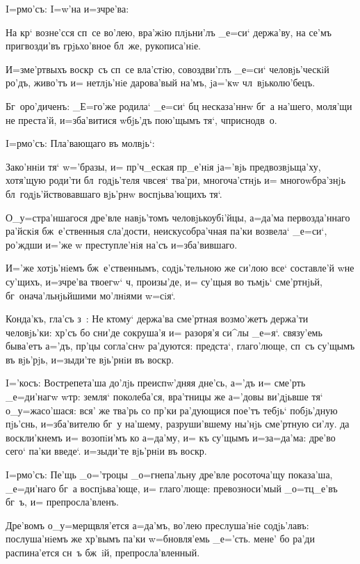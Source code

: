  I=рмо'съ: I=w'на и=з\ъ чре'ва:

На кр` возне'сся сп~се во'лею, вра'жiю плjьни'лъ 
_е=си` держа'ву, на се'мъ пригвозди'въ грjьхо'вное бл~же, 
рукописа'нiе.

И=з\ъ ме'ртвыхъ воскр~съ сп~се вла'стiю, совоздви'глъ 
_е=си` человjь'ческiй ро'дъ, живо'тъ и= нетлjь'нiе 
дарова'вый на'мъ, jа='кw чл~вjьколю'бецъ.

Бг~оро'диченъ: _Е=го'же родила` _е=си` бц 
несказа'ннw бг~а на'шего, моля'щи не преста'й, 
и=зба'витися w\т бjь'дъ пою'щымъ тя`, ч приснодв~о.

 I=рмо'съ: Пла'вающаго въ молвjь`:

Зако'ннiи тя` w='бразы, и= пр'ч_еская 
пр_е'нiя jа='вjь предвозвjьща'ху, хотя'щую роди'ти 
бл~годjь'теля ч всея` тва'ри, многоча'стнjь и= 
многоwбра'знjь бл~годjь'йствовавшаго вjь'рнw 
воспjьва'ющихъ тя`.

О_у=стра'ншагося дре'вле навjь'томъ человjькоубi'йцы, 
а=да'ма первозда'ннаго ра'йскiя бж~е'ственныя сла'дости, 
неискусобра'чная па'ки возвела` _е=си`, ро'ждши и='же w\т 
преступле'нiя на'съ и=зба'вившаго.

И='же хотjь'нiемъ бж~е'ственнымъ, содjь'тельною же 
си'лою все` составле'й w\т не су'щихъ, и=з\ъ чре'ва 
твоегw` ч, произы'де, и= су'щыя во тьмjь` 
сме'ртнjьй, бг~онача'льнjьйшими мо'лнiями w=сiя`.

Конда'къ, гла'съ з~: Не ктому` держа'ва сме'ртная 
возмо'жетъ держа'ти человjь'ки: хр'съ бо сни'де 
сокруша'я и= разоря'я си^лы _е=я`. связу'емь быва'етъ 
а='дъ, пр'цы согла'снw ра'дуются: предста`, 
глаго'люще, сп~съ су'щымъ въ вjь'рjь, и=зыди'те вjь'рнiи 
въ воскр.

I='косъ: Вострепета'ша до'лjь преиспw'дняя дне'сь, 
а='дъ и= сме'рть _е=ди'нагw w\т тр: земля` 
поколеба'ся, вра'тницы же а='довы ви'дjьвше тя` 
о_у=жасо'шася: вся' же тва'рь со пр'ки ра'дующися 
пое'тъ тебjь` побjь'дную пjь'снь, и=зба'вителю бг~у 
на'шему, разруши'вшему ны'нjь сме'ртную си'лу. да 
воскли'кнемъ и= возопiи'мъ ко а=да'му, и= къ су'щымъ 
и=з\ъ а=да'ма: дре'во сего` па'ки введе`. и=зыди'те 
вjь'рнiи въ воскр.


I=рмо'съ: Пе'щь _о='троцы _о=гнепа'льну дре'вле 
росоточа'щу показа'ша, _е=ди'наго бг~а воспjьва'юще, и= 
глаго'люще: превозноси'мый _о=тц_е'въ бг~ъ, и= 
препросла'вленъ.

Дре'вомъ о_у=мерщвля'ется а=да'мъ, во'лею преслуша'нiе 
содjь'лавъ: послуша'нiемъ же хр'вымъ па'ки 
w=бновля'емь _е='сть. мене' бо ра'ди распина'ется сн~ъ 
бж~iй, препросла'вленный.

